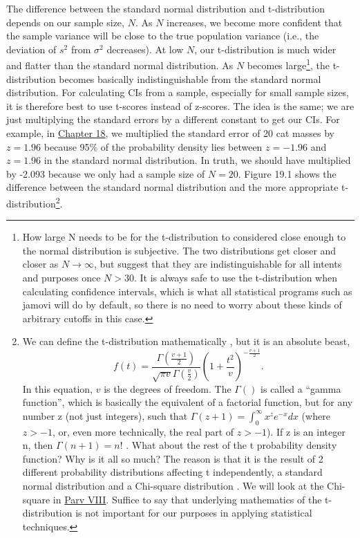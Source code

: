 \documentclass[
  openany]{krantz}
\begin{document}
The difference between the standard normal distribution and t-distribution depends on our sample size, \(N\).
As \(N\) increases, we become more confident that the sample variance will be close to the true population variance (i.e., the deviation of \(s^{2}\) from \(\sigma^{2}\) decreases).
At low \(N\), our t-distribution is much wider and flatter than the standard normal distribution.
As \(N\) becomes large\footnote{How large N needs to be for the t-distribution to considered close enough to the normal distribution is subjective. The two distributions get closer and closer as \(N \to \infty\), but \citet{Sokal1995} suggest that they are indistinguishable for all intents and purposes once \(N > 30\). It is always safe to use the t-distribution when calculating confidence intervals, which is what all statistical programs such as jamovi will do by default, so there is no need to worry about these kinds of arbitrary cutoffs in this case.}, the t-distribution becomes basically indistinguishable from the standard normal distribution.
For calculating CIs from a sample, especially for small sample sizes, it is therefore best to use t-scores instead of z-scores.
The idea is the same; we are just multiplying the standard errors by a different constant to get our CIs.
For example, in \protect\hyperlink{Chapter_18}{Chapter 18}, we multiplied the standard error of 20 cat masses by \(z = 1.96\) because 95\% of the probability density lies between \(z = -1.96\) and \(z = 1.96\) in the standard normal distribution.
In truth, we should have multiplied by -2.093 because we only had a sample size of \(N = 20\).
Figure 19.1 shows the difference between the standard normal distribution and the more appropriate t-distribution\footnote{We can define the t-distribution mathematically \citep{Miller2004}, but it is an absolute beast, \[f(t) = \frac{\Gamma\left(\frac{v + 1}{2} \right)}{\sqrt{\pi v} \Gamma{\left(\frac{v}{2}\right)}}\left(1 + \frac{t^{2}}{v} \right)^{-\frac{v + 1}{2}}.\] In this equation, \(v\) is the degrees of freedom. The \(\Gamma\left(\right)\) is called a ``gamma function'', which is basically the equivalent of a factorial function, but for any number z (not just integers), such that \(\Gamma(z + 1) = \int_{0}^{\infty}x^{z}e^{-x}dx\) (where \(z > -1\), or, even more technically, the real part of \(z > -1\)). If z is an integer n, then \(\Gamma\left({n + 1}\right) = n!\) \citep{Borowski2005}. What about the rest of the t probability density function? Why is it all so much? The reason is that it is the result of 2 different probability distributions affecting t independently, a standard normal distribution and a Chi-square distribution \citep{Miller2004}. We will look at the Chi-square in \protect\hyperlink{Week_8}{Parv VIII}. Suffice to say that underlying mathematics of the t-distribution is not important for our purposes in applying statistical techniques.}.
\end{document}
